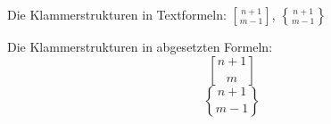 \documentclass{article}
\newcommand{\labrack}[2]{#1\brack #2}
\newcommand{\labrace}[2]{#1\brace #2}
\begin{document}
Die Klammerstrukturen in Textformeln: $\labrack{n+1}{m-1}$,
$\labrace{n+1}{m-1}$

Die Klammerstrukturen in abgesetzten Formeln:
\[ \labrack{n+1}{m} \] 
\[ \labrace{n+1}{m-1} \]
\end{document}
